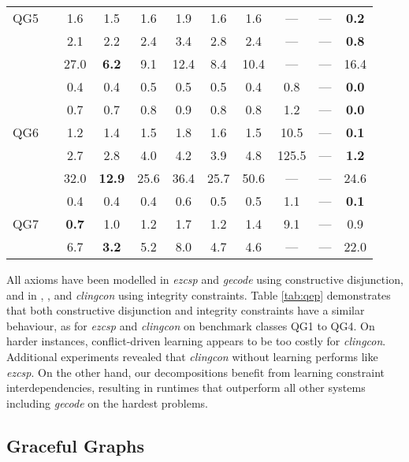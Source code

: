 \documentclass{tlp}
\newcommand{\systemname}[1]{\emph{#1}}
\begin{document}
\begin{table}
\begin{minipage}{\textwidth}
\begin{tabular}{ccccccccccc}
QG5 & & 1.6 & 1.5 &1.6 & 1.9 & 1.6 & 1.6 & --- & --- & \textbf{0.2} \\
& & 2.1 & 2.2 &2.4 & 3.4 & 2.8 & 2.4 & --- & --- & \textbf{0.8} \\
& &27.0 &\textbf{6.2}&9.1 &12.4 & 8.4 &10.4 & --- & --- & 16.4 \\ \noalign{\vspace {.2cm}}
&  & 0.4 & 0.4 &0.5 & 0.5 & 0.5 & 0.4 & 0.8 & --- & \textbf{0.0} \\
&  & 0.7 & 0.7 &0.8 & 0.9 & 0.8 & 0.8 & 1.2 & --- & \textbf{0.0} \\
QG6 & & 1.2 & 1.4 &1.5 & 1.8 & 1.6 & 1.5 &10.5 & --- & \textbf{0.1} \\
& & 2.7 & 2.8 &4.0 & 4.2 & 3.9 & 4.8 &125.5& --- & \textbf{1.2} \\
& &32.0 &\textbf{12.9}&25.6 &36.4 &25.7 &50.6 & --- & --- & 24.6 \\ \noalign{\vspace {.2cm}}
&  & 0.4 & 0.4 &0.4 & 0.6 & 0.5 & 0.5 & 1.1 & --- & \textbf{0.1} \\
QG7 &  & \textbf{0.7} & 1.0 &1.2 & 1.7 & 1.2 & 1.4 & 9.1 & --- & 0.9 \\
&  & 6.7 & \textbf{3.2} &5.2 & 8.0 & 4.7 & 4.6 & --- & --- & 22.0 \\ \hline\hline
\end{tabular}
\vspace{-2\baselineskip}
\end{minipage}
\end{table}
All axioms have been modelled in \systemname{ezcsp} and \systemname{gecode} using constructive disjunction, and in , ,  and \systemname{clingcon} using integrity constraints.
Table \ref{tab:qep} demonstrates that both constructive disjunction and integrity constraints have a similar behaviour, as for \systemname{ezcsp} and \systemname{clingcon} on benchmark classes QG1 to QG4. On harder instances, 
conflict-driven learning appears to be too costly for \systemname{clingcon}. Additional experiments revealed that \systemname{clingcon} without learning performs like \systemname{ezcsp}. 
On the other hand, our decompositions benefit from learning constraint interdependencies, resulting in runtimes that outperform all other systems including \systemname{gecode} on the hardest problems.


\subsection{Graceful Graphs}
\end{document}
